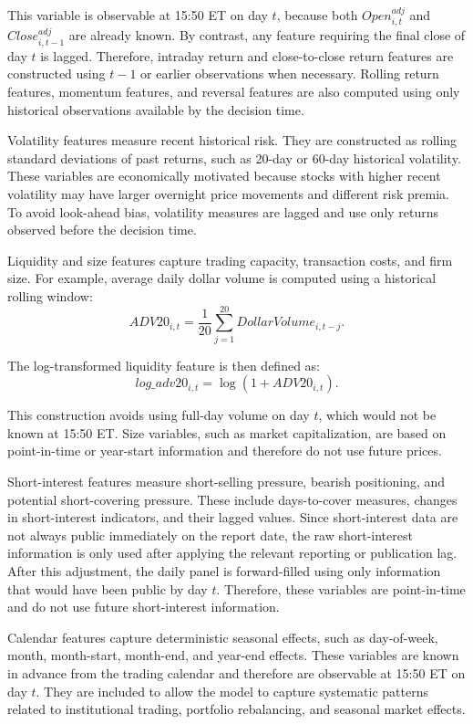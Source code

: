 \documentclass[12pt]{article}
\begin{document}
This variable is observable at 15:50 ET on day $t$, because both $Open^{adj}_{i,t}$ and $Close^{adj}_{i,t-1}$ are already known. By contrast, any feature requiring the final close of day $t$ is lagged. Therefore, intraday return and close-to-close return features are constructed using $t-1$ or earlier observations when necessary. Rolling return features, momentum features, and reversal features are also computed using only historical observations available by the decision time.

Volatility features measure recent historical risk. They are constructed as rolling standard deviations of past returns, such as 20-day or 60-day historical volatility. These variables are economically motivated because stocks with higher recent volatility may have larger overnight price movements and different risk premia. To avoid look-ahead bias, volatility measures are lagged and use only returns observed before the decision time.

Liquidity and size features capture trading capacity, transaction costs, and firm size. For example, average daily dollar volume is computed using a historical rolling window:
\begin{equation}
    ADV20_{i,t} = \frac{1}{20} \sum_{j=1}^{20} DollarVolume_{i,t-j}.
\end{equation}

The log-transformed liquidity feature is then defined as:
\begin{equation}
    log\_adv20_{i,t} = \log(1 + ADV20_{i,t}).
\end{equation}

This construction avoids using full-day volume on day $t$, which would not be known at 15:50 ET. Size variables, such as market capitalization, are based on point-in-time or year-start information and therefore do not use future prices.

Short-interest features measure short-selling pressure, bearish positioning, and potential short-covering pressure. These include days-to-cover measures, changes in short-interest indicators, and their lagged values. Since short-interest data are not always public immediately on the report date, the raw short-interest information is only used after applying the relevant reporting or publication lag. After this adjustment, the daily panel is forward-filled using only information that would have been public by day $t$. Therefore, these variables are point-in-time and do not use future short-interest information.

Calendar features capture deterministic seasonal effects, such as day-of-week, month, month-start, month-end, and year-end effects. These variables are known in advance from the trading calendar and therefore are observable at 15:50 ET on day $t$. They are included to allow the model to capture systematic patterns related to institutional trading, portfolio rebalancing, and seasonal market effects.
\end{document}
